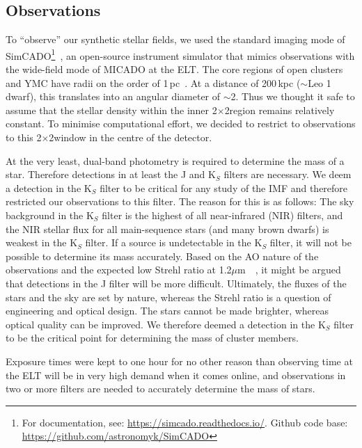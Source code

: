 \documentclass[referee]{aa}
\newcommand{\um}{$\mu$m~}
\newcommand{\s}{$\sim$}
\begin{document}
\subsection{Observations}
\label{sec:telescope}

To ``observe'' our synthetic stellar fields, we used the standard imaging mode of SimCADO\footnote{For documentation, see: \url{https://simcado.readthedocs.io/}.
Github code base: \url{https://github.com/astronomyk/SimCADO}}~\citep{leschinski2016}, an open-source instrument simulator that mimics observations with the wide-field mode of MICADO at the ELT\@.
The core regions of open clusters and YMC have radii on the order of 1\,pc~\citep{portegies2010}.
At a distance of 200\,kpc ($\sim$Leo 1 dwarf), this translates into an angular diameter of \s2\arcsec.
Thus we thought it safe to assume that the stellar density within the inner 2\arcsec$\times$2\arcsec region remains relatively constant.
To minimise computational effort, we decided to restrict to observations to this 2\arcsec$\times$2\arcsec window in the centre of the detector.

At the very least, dual-band photometry is required to determine the mass of a star.
Therefore detections in at least the J and K$_S$ filters are necessary.
We deem a detection in the K$_S$ filter to be critical for any study of the IMF and therefore restricted our observations to this filter.
The reason for this is as follows: The sky background in the K$_S$ filter is the highest of all near-infrared (NIR) filters, and the NIR stellar flux for all main-sequence stars (and many brown dwarfs) is weakest in the K$_S$ filter.
If a source is undetectable in the K$_S$ filter, it will not be possible to determine its mass accurately.
Based on the AO nature of the observations and the expected low Strehl ratio at 1.2\um~\citep{clenet2016}, it might be argued that detections in the J filter will be more difficult.
Ultimately, the fluxes of the stars and the sky are set by nature, whereas the Strehl ratio is a question of engineering and optical design.
The stars cannot be made brighter, whereas optical quality can be improved.
We therefore deemed a detection in the K$_S$ filter to be the critical point for determining the mass of cluster members.

Exposure times were kept to one hour for no other reason than observing time at the ELT will be in very high demand when it comes online, and observations in two or more filters are needed to accurately determine the mass of stars.
\end{document}
